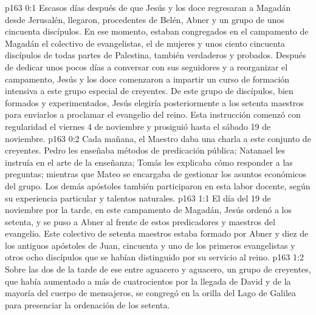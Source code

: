 \author{Comisión de seres intermedios}
\vs p163 0:1 Escasos días después de que Jesús y los doce regresaran a Magadán desde Jerusalén, llegaron, procedentes de Belén, Abner y un grupo de unos cincuenta discípulos. En ese momento, estaban congregados en el campamento de Magadán el colectivo de evangelistas, el de mujeres y unos ciento cincuenta discípulos de todas partes de Palestina, también verdaderos y probados. Después de dedicar unos pocos días a conversar con sus seguidores y a reorganizar el campamento, Jesús y los doce comenzaron a impartir un curso de formación intensiva a este grupo especial de creyentes. De este grupo de discípulos, bien formados y experimentados, Jesús elegiría posteriormente a los setenta maestros para enviarlos a proclamar el evangelio del reino. Esta instrucción comenzó con regularidad el viernes 4 de noviembre y prosiguió hasta el sábado 19 de noviembre.
\vs p163 0:2 Cada mañana, el Maestro daba una charla a este conjunto de creyentes. Pedro les enseñaba métodos de predicación pública; Natanael les instruía en el arte de la enseñanza; Tomás les explicaba cómo responder a las preguntas; mientras que Mateo se encargaba de gestionar los asuntos económicos del grupo. Los demás apóstoles también participaron en esta labor docente, según su experiencia particular y talentos naturales.
\vs p163 1:1 El día del  19 de noviembre por la tarde, en este campamento de Magadán, Jesús ordenó a los setenta, y se puso a Abner al frente de estos predicadores y maestros del evangelio. Este colectivo de setenta maestros estaba formado por Abner y diez de los antiguos apóstoles de Juan, cincuenta y uno de los primeros evangelistas y otros ocho discípulos que se habían distinguido por su servicio al reino.
\vs p163 1:2 Sobre las dos de la tarde de ese  entre aguacero y aguacero, un grupo de creyentes, que había aumentado a más de cuatrocientos por la llegada de David y de la mayoría del cuerpo de mensajeros, se congregó en la orilla del Lago de Galilea para presenciar la ordenación de los setenta.
